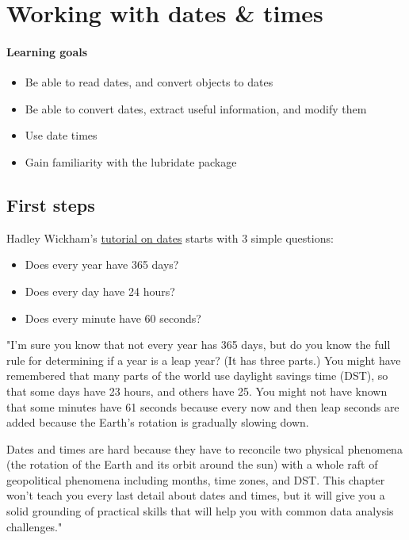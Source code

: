 \documentclass[
]{book}
\providecommand{\tightlist}{%
  \setlength{\itemsep}{0pt}\setlength{\parskip}{0pt}}
\begin{document}
\hypertarget{dates}{%
\chapter{Working with dates \& times}\label{dates}}

\hypertarget{learning-goals-19}{%
\subsubsection*{Learning goals}\label{learning-goals-19}}

\begin{itemize}
\tightlist
\item
  Be able to read dates, and convert objects to dates
\item
  Be able to convert dates, extract useful information, and modify them
\item
  Use date times
\item
  Gain familiarity with the lubridate package
\end{itemize}

\hypertarget{first-steps-2}{%
\section*{First steps}\label{first-steps-2}}

Hadley Wickham's \href{https://r4ds.had.co.nz/dates-and-times.html}{tutorial on dates} starts with 3 simple questions:

\begin{itemize}
\tightlist
\item
  Does every year have 365 days?
\item
  Does every day have 24 hours?
\item
  Does every minute have 60 seconds?
\end{itemize}

"I'm sure you know that not every year has 365 days, but do you know the full rule for determining if a year is a leap year?
(It has three parts.) You might have remembered that many parts of the world use daylight savings time (DST), so that some days have 23 hours, and others have 25.
You might not have known that some minutes have 61 seconds because every now and then leap seconds are added because the Earth's rotation is gradually slowing down.

Dates and times are hard because they have to reconcile two physical phenomena (the rotation of the Earth and its orbit around the sun) with a whole raft of geopolitical phenomena including months, time zones, and DST.
This chapter won't teach you every last detail about dates and times, but it will give you a solid grounding of practical skills that will help you with common data analysis challenges."
\end{document}
